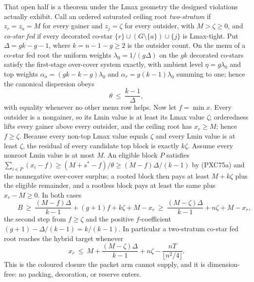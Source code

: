 \documentclass[11pt]{article}
\begin{document}
That open half is a theorem under the Lmax geometry the designed
violations actually exhibit.  Call an ordered saturated ceiling root
\emph{two-stratum} if $z_r=z_a=M$ for every gainer and $z_j=\zeta$ for
every outsider, with $M>\zeta\ge0$, and \emph{co-star fed} if every
decorated co-star $\{r\}\cup(G\setminus\{a\})\cup\{j\}$ is Lmax-tight.
Put $\Delta=gk-g-1$, where $k=n-1-g\ge2$ is the outsider count.  On the
menu of a co-star fed root the uniform weights
$\lambda_0=1/(g\Delta)$ on the $gk$ decorated co-stars satisfy the
first-stage over-cover system exactly, with ambient level
$\eta=g\lambda_0$ and top weights $\alpha_a=(gk-k-g)\lambda_0$ and
$\alpha_r=g(k-1)\lambda_0$ summing to one; hence the canonical
dispersion obeys
\[
 \theta\ \le\ \frac{k-1}{\Delta},                     \tag{PXC75a}
\]
with equality whenever no other menu row helps.  Now let $f=\min x$.
Every outsider is a nongainer, so its Lmin value is at least its Lmax
value $\zeta$; orderedness lifts every gainer above every outsider, and
the ceiling root has $x_r\ge M$; hence $f\ge\zeta$.  Because every non-top Lmax value equals $\zeta$ and every
Lmin value is at least $\zeta$, the residual of every candidate top
block is exactly $k\zeta$.  Assume every nonroot Lmin value is at most
$M$.  An eligible block $P$ satisfies
$\sum_{i\in P}(x_i-f)\ge(M+s^*-f)/\theta\ge(M-f)\Delta/(k-1)$ by
(PXC75a) and the nonnegative over-cover surplus; a rooted block then
pays at least $M+k\zeta$ plus the eligible remainder, and a rootless
block pays at least the same plus $x_r-M\ge0$.  In both cases
\[
 \boxed{\qquad
 B\ \ge\ \frac{(M-f)\Delta}{k-1}+(g+1)f+k\zeta+M-x_r
 \ \ge\ \frac{(M-\zeta)\Delta}{k-1}+n\zeta+M-x_r,
 \qquad}                                             \tag{PXC75}
\]
the second step from $f\ge\zeta$ and the positive $f$-coefficient
$(g+1)-\Delta/(k-1)=k/(k-1)$.  In particular a two-stratum co-star fed
root reaches the hybrid target whenever
\[
 x_r\ \le\ M+\frac{(M-\zeta)\Delta}{k-1}+n\zeta
 -\frac{nT}{\lfloor n^2/4\rfloor}.                    \tag{PXC75b}
\]
This is the coloured closure the packet arm cannot supply, and it is
dimension-free: no packing, decoration, or reserve enters.
\end{document}
